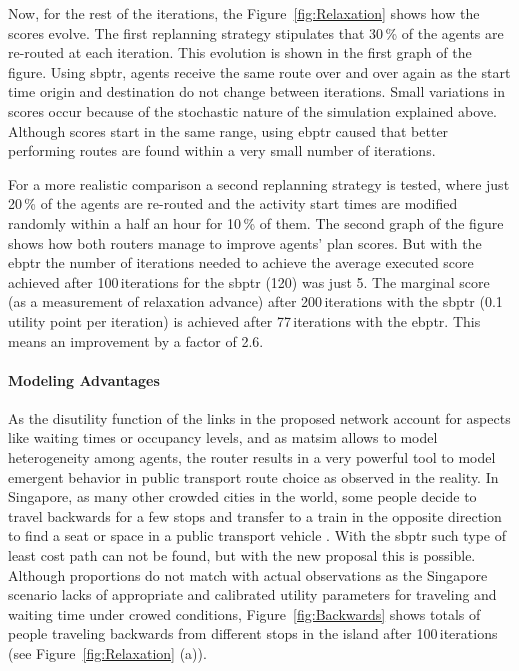 Now, for the rest of the iterations, the Figure~\ref{fig:Relaxation} shows how the scores evolve. The first replanning strategy stipulates that 30\,\% of the agents are re-routed at each iteration. This evolution is shown in the first graph of the figure. Using \gls{sbptr}, agents receive the same route over and over again as the start time origin and destination do not change between iterations. Small variations in scores occur because of the stochastic nature of the simulation explained above. Although scores start in the same range, using \gls{ebptr} caused that better performing routes are found within a very small number of iterations.

For a more realistic comparison a second replanning strategy is tested, where just 20\,\% of the agents are re-routed and the activity start times are modified randomly within a half an hour for 10\,\% of them. The second graph of the figure shows how both routers manage to improve agents' plan scores. But with the \gls{ebptr} the number of iterations needed to achieve the average executed score achieved after 100\,iterations for the \gls{sbptr} (120) was just 5. The marginal score (as a measurement of relaxation advance) after 200\,iterations with the \gls{sbptr} (0.1\,utility point per iteration) is achieved after 77\,iterations with the \gls{ebptr}. This means an improvement by a factor of 2.6.

\paragraph{Modeling Advantages}

As the disutility function of the links in the proposed network account for aspects like waiting times or occupancy levels, and as \gls{matsim} allows to model heterogeneity among agents, the router results in a very powerful tool to model emergent behavior in public transport route choice as observed in the reality. In Singapore, as many other crowded cities in the world, some people decide to travel backwards for a few stops and transfer to a train in the opposite direction to find a seat or space in a public transport vehicle \cite{ChakirovErath_HKSTS_2011}. With the \gls{sbptr} such type of least cost path can not be found, but with the new proposal this is possible. Although proportions do not match with actual observations as the Singapore scenario lacks of appropriate and calibrated utility parameters for traveling and waiting time under crowed conditions, Figure~\ref{fig:Backwards} shows totals of people traveling backwards from different stops in the island after 100\,iterations (see Figure~\ref{fig:Relaxation} (a)).

